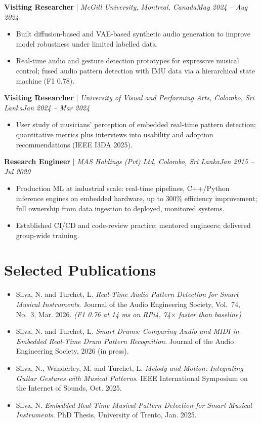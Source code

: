 \documentclass[11pt]{article}
\newenvironment{cvrole}[5]{%
  \par\noindent\textbf{\large #1} | \textit{\small #2, #3}\hfill \textit{\small #4 -- #5}\par
  \begin{itemize}[leftmargin=2em, itemsep=-0.3em, topsep=-0.5em]%
}{%
  \end{itemize}\par\noindent\mbox{}\par\vspace{0.1em}%
}
\begin{document}
\begin{cvrole}{Visiting Researcher}{McGill University}{Montreal, Canada}{May 2024}{Aug 2024}
    \item Built diffusion-based and VAE-based synthetic audio generation to improve model robustness under limited labelled data.
    \item Real-time audio and gesture detection prototypes for expressive musical control; fused audio pattern detection with IMU data via a hierarchical state machine (F1 0.78).
\end{cvrole}

\begin{cvrole}{Visiting Researcher}{University of Visual and Performing Arts}{Colombo, Sri Lanka}{Jan 2024}{Mar 2024}
    \item User study of musicians' perception of embedded real-time pattern detection; quantitative metrics plus interviews into usability and adoption recommendations (IEEE I3DA 2025).
\end{cvrole}

\begin{cvrole}{Research Engineer}{MAS Holdings (Pvt) Ltd}{Colombo, Sri Lanka}{Jan 2015}{Jul 2020}
    \item Production ML at industrial scale: real-time pipelines, C++/Python inference engines on embedded hardware, up to 300\% efficiency improvement; full ownership from data ingestion to deployed, monitored systems.
    \item Established CI/CD and code-review practice; mentored engineers; delivered group-wide training.
\end{cvrole}

\section*{Selected Publications \footnotesize {}}
\begin{itemize}[leftmargin=1.2em, itemsep=-0.25em]
    \item Silva, N. and Turchet, L. \textit{Real-Time Audio Pattern Detection for Smart Musical Instruments}. Journal of the Audio Engineering Society, Vol.~74, No.~3, Mar. 2026. \textit{(F1 0.76 at 14 ms on RPi4, 74$\times$ faster than baseline)}
    \item Silva, N. and Turchet, L. \textit{Smart Drums: Comparing Audio and MIDI in Embedded Real-Time Drum Pattern Recognition}. Journal of the Audio Engineering Society, 2026 (in press).
    \item Silva, N., Wanderley, M. and Turchet, L. \textit{Melody and Motion: Integrating Guitar Gestures with Musical Patterns}. IEEE International Symposium on the Internet of Sounds, Oct. 2025.
    \item Silva, N. \textit{Embedded Real-Time Musical Pattern Detection for Smart Musical Instruments}. PhD Thesis, University of Trento, Jan. 2025.
\end{itemize}
\end{document}
